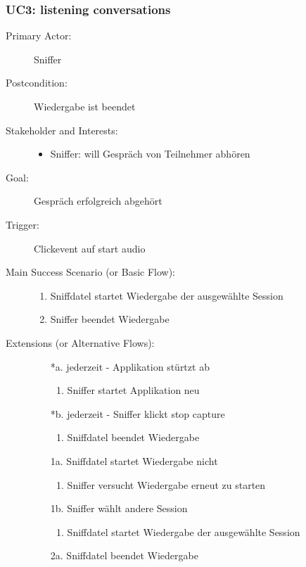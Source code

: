 \documentclass[a4,12pt]{scrartcl}
\begin{document}
\subsubsection{UC3: listening conversations}
	\begin{description}
		\item[Primary Actor:] Sniffer
		\item[Postcondition:] Wiedergabe ist beendet
  		\item[Stakeholder and Interests:] \hfill
  			\begin{itemize}
  				\item Sniffer: will Gespräch von Teilnehmer abhören
  			\end{itemize}
 		\item[Goal:] Gespräch erfolgreich abgehört
  		\item[Trigger:] Clickevent auf \grqq start audio\grqq 
 		\item[Main Success Scenario (or Basic Flow):] \hfill
  			\begin{enumerate}
  				\item Sniffdatel startet Wiedergabe der ausgewählte Session
				\item Sniffer beendet Wiedergabe
			\end{enumerate}
  		\item[Extensions (or Alternative Flows):] \hfill  
  			\begin{itemize}
				\item[*a.] jederzeit - Applikation stürtzt ab
  					\begin{enumerate}
  						\item Sniffer startet Applikation neu
					\end{enumerate}
				\item[*b.] jederzeit - Sniffer klickt \grqq stop capture\grqq 
  					\begin{enumerate}
  						\item Sniffdatel beendet Wiedergabe
					\end{enumerate}
				\item[1a.] Sniffdatel startet Wiedergabe nicht
  					\begin{enumerate}
  						\item Sniffer versucht Wiedergabe erneut zu starten
					\end{enumerate}
				\item[1b.] Sniffer wählt andere Session
  					\begin{enumerate}
  						\item Sniffdatel startet Wiedergabe der ausgewählte Session
					\end{enumerate}
				\item[2a.] Sniffdatel beendet Wiedergabe					
			\end{itemize}
\end{description}
\end{document}
